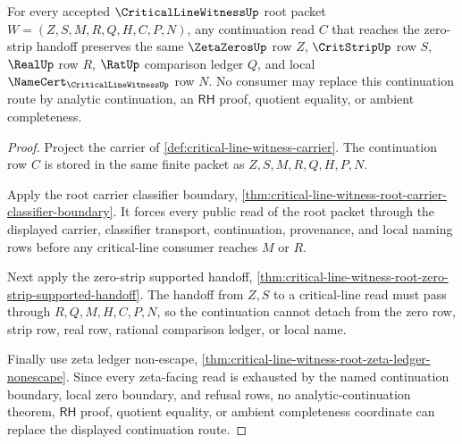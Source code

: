 \begin{theorem}
\label{thm:critical-line-witness-root-continuation-zero-strip-coherence}
For every accepted $\CriticalLineWitnessUp$ root packet $W=(Z,S,M,R,Q,H,C,P,N)$, any continuation read $C$ that reaches the zero-strip handoff preserves the same $\ZetaZerosUp$ row $Z$, $\CritStripUp$ row $S$, $\RealUp$ row $R$, $\RatUp$ comparison ledger $Q$, and local $\NameCert_{\CriticalLineWitnessUp}$ row $N$. No consumer may replace this continuation route by analytic continuation, an $\mathsf{RH}$ proof, quotient equality, or ambient completeness.
\end{theorem}
\begin{proof}
Project the carrier of \autoref{def:critical-line-witness-carrier}. The continuation row $C$ is stored in the same finite packet as $Z,S,M,R,Q,H,P,N$.

Apply the root carrier classifier boundary, \autoref{thm:critical-line-witness-root-carrier-classifier-boundary}. It forces every public read of the root packet through the displayed carrier, classifier transport, continuation, provenance, and local naming rows before any critical-line consumer reaches $M$ or $R$.

Next apply the zero-strip supported handoff, \autoref{thm:critical-line-witness-root-zero-strip-supported-handoff}. The handoff from $Z,S$ to a critical-line read must pass through $R,Q,M,H,C,P,N$, so the continuation cannot detach from the zero row, strip row, real row, rational comparison ledger, or local name.

Finally use zeta ledger non-escape, \autoref{thm:critical-line-witness-root-zeta-ledger-nonescape}. Since every zeta-facing read is exhausted by the named continuation boundary, local zero boundary, and refusal rows, no analytic-continuation theorem, $\mathsf{RH}$ proof, quotient equality, or ambient completeness coordinate can replace the displayed continuation route.
\end{proof}

